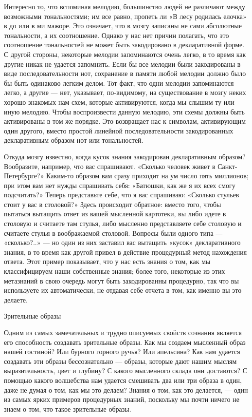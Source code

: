 \documentclass[../main.tex]{subfiles}
\begin{document}
Интересно то, что вспоминая мелодию, большинство людей не различают между возможными тональностями; им все равно, пропеть ли «В лесу родилась елочка» в до или в ми мажоре. Это означает, что в мозгу записаны не сами абсолютные тональности, а их соотношение. Однако у нас нет причин полагать, что это соотношение тональностей не может быть закодировано в декларативной форме. С другой стороны, некоторые мелодии запоминаются очень легко, в то время как другие никак не удается запомнить. Если бы все мелодии были закодированы в виде последовательности нот, сохранение в памяти любой мелодии должно было бы быть одинаково легким делом. Тот факт, что одни мелодии запоминаются легко, а другие --- нет, указывает, по-видимому, на существование в мозгу неких хорошо знакомых нам схем, которые активируются, когда мы слышим ту или иную мелодию. Чтобы воспроизвести данную мелодию, эти схемы должны быть активированы в том же порядке. Это возвращает нас к символам, активирующим один другого, вместо простой линейной последовательности закодированных декларативным образом нот или тональностей.

Откуда мозгу известно, когда кусок знания закодирован декларативным образом? Вообразите, например, что вас спрашивают. «Сколько человек живет в Санкт-Петербурге?» Каким-то образом вам сразу приходит на ум число пять миллионов; при этом вам нет нужды спрашивать себя: «Батюшки, как же я их всех смогу подсчитать?» Теперь представьте себе, что я вас спрашиваю: «Сколько стульев стоит у вас в столовой?» Здесь происходит обратное: вместо того, чтобы пытаться вытащить ответ из вашей мысленной картотеки, вы либо идете в столовую и считаете там стулья, либо мысленно представляете себе столовую и считаете стулья в воображаемой столовой. Вопросы были одного типа --- «сколько?..» --- но один из них заставил вас вытащить «кусок» декларативного знания, в то время как другой привел в действие процедурный метод нахождения ответа. Этот пример показывает, что у нас есть знания о том, как мы классифицируем наши собственные знания; более того, некоторые из этих метазнаний в свою очередь могут быть закодированны процедурно, так что вы используете их автоматически, не отдавая себе отчета в том, как именно вы это делаете.

Зрительные образы

Одним из самых замечательных и трудно описуемых свойств сознания является его способность создавать зрительные образы. Как мы создаем мысленный образ нашей гостиной? Или бурного горного ручья? Или апельсина? Как нам удается создавать эти образы бессознательно --- образы, которые дают нашим мыслям выразительность, цвет и глубину? С какого мысленного склада они достаются? С помощью какого волшебства нам удается смешивать два или три образа в один, даже не думая о том, как мы это делаем? Знания о том, как это делается, --- один из самых ярких примеров процедурных знаний, поскольку мы почти ничего не знаем о том, что такое зрительные образы.
\end{document}
